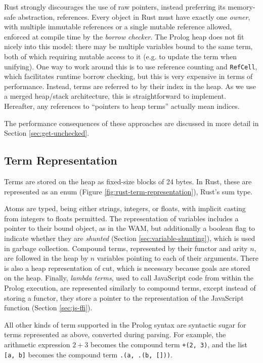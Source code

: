 Rust strongly discourages the use of raw pointers, instead preferring its memory-safe abstraction, references. Every object in Rust must have exactly one \emph{owner}, with multiple immutable references or a single mutable reference allowed, enforced at compile time by the \emph{borrow checker}. The Prolog heap does not fit nicely into this model: there may be multiple variables bound to the same term, both of which requiring mutable access to it (e.g. to update the term when unifying). One way to work around this is to use reference counting and \texttt{RefCell}, which facilitates runtime borrow checking, but this is very expensive in terms of performance. Instead, terms are referred to by their index in the heap. As we use a merged heap/stack architecture, this is straightforward to implement. Hereafter, any references to ``pointers to heap terms'' actually mean indices.

The performance consequences of these approaches are discussed in more detail in Section \ref{sec:get-unchecked}.

\subsection{Term Representation}

\label{sec:term-representation}

Terms are stored on the heap as fixed-size blocks of 24 bytes. In Rust, these are represented as an enum (Figure \ref{fig:rust-term-representation}), Rust's sum type.

Atoms are typed, being either strings, integers, or floats, with implicit casting from integers to floats permitted. The representation of variables includes a pointer to their bound object, as in the WAM, but additionally a boolean flag to indicate whether they are \emph{shunted} (Section \ref{sec:variable-shunting}), which is used in garbage collection. Compound terms, represented by their functor and arity $n$, are followed in the heap by $n$ variables pointing to each of their arguments. There is also a heap representation of cut, which is necessary because goals are stored on the heap. Finally, \emph{lambda terms}, used to call JavaScript code from within the Prolog execution, are represented similarly to compound terms, except instead of storing a functor, they store a pointer to the representation of the JavaScript function (Section \ref{sec:js-ffi}).

All other kinds of term supported in the Prolog syntax are syntactic sugar for terms represented as above, converted during parsing. For example, the arithmetic expression $2 + 3$ becomes the compound term \texttt{+(2, 3)}, and the list \texttt{[a, b]} becomes the compound term \texttt{.(a, .(b, []))}.

